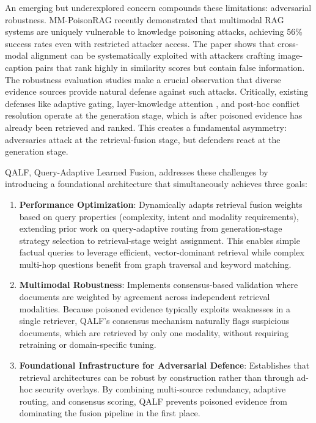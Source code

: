 \documentclass[11pt]{article}
\begin{document}
An emerging but underexplored concern compounds these limitations: adversarial robustness. MM-PoisonRAG \cite{ha_mm-poisonrag_2025} recently demonstrated that multimodal RAG systems are uniquely vulnerable to knowledge poisoning attacks, achieving 56\% success rates even with restricted attacker access. The paper shows that cross-modal alignment can be systematically exploited with attackers crafting image-caption pairs that rank highly in similarity scores but contain false information. The robustness evaluation studies \cite{amirshahi_evaluating_2025} make a crucial observation that diverse evidence sources provide natural defense against such attacks. Critically, existing defenses like adaptive gating, layer-knowledge attention \cite{shi_making_2025}, and post-hoc conflict resolution operate at the generation stage, which is after poisoned evidence has already been retrieved and ranked. This creates a fundamental asymmetry: adversaries attack at the retrieval-fusion stage, but defenders react at the generation stage.

QALF, Query-Adaptive Learned Fusion, addresses these challenges by introducing a foundational architecture that simultaneously achieves three goals:
\begin{enumerate}
    \item \textbf{Performance Optimization}: Dynamically adapts retrieval fusion weights based on query properties (complexity, intent and modality requirements), extending prior work on query-adaptive routing \cite{jeong_adaptive-rag_2024} from generation-stage strategy selection to retrieval-stage weight assignment. This enables simple factual queries to leverage efficient, vector-dominant retrieval while complex multi-hop questions benefit from graph traversal and keyword matching.
    \item \textbf{Multimodal Robustness}: Implements consensus-based validation where documents are weighted by agreement across independent retrieval modalities. Because poisoned evidence typically exploits weaknesses in a single retriever, QALF's consensus mechanism naturally flags suspicious documents, which are retrieved by only one modality, without requiring retraining or domain-specific tuning.
    \item \textbf{Foundational Infrastructure for Adversarial Defence}: Establishes that retrieval architectures can be robust by construction rather than through ad-hoc security overlays. By combining multi-source redundancy, adaptive routing, and consensus scoring, QALF prevents poisoned evidence from dominating the fusion pipeline in the first place.
\end{enumerate}
\end{document}
